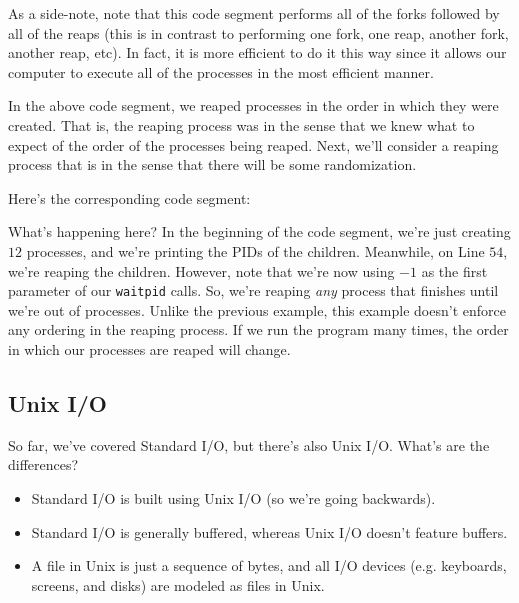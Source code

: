As a side-note, note that this code segment performs all of the forks followed by all of the reaps (this is in contrast to performing one fork, one reap, another fork, another reap, etc). In fact, it is more efficient to do it this way since it allows our computer to execute all of the processes in the most efficient manner.

In the above code segment, we reaped processes in the order in which they were created. That is, the reaping process was  in the sense that we knew what to expect of the order of the processes being reaped. Next, we'll consider a reaping process that is  in the sense that there will be some randomization.


Here's the corresponding code segment:

\lstset{caption=Probablistic Reaping} 
\begin{center}

\end{center}

What's happening here? In the beginning of the code segment, we're just creating $12$  processes, and we're printing the PIDs of the children. Meanwhile, on Line $54$, we're reaping the children. However, note that we're now using $-1$ as the first parameter of our \verb!waitpid! calls. So, we're reaping \textit{any} process that finishes until we're out of processes. Unlike the previous example, this example doesn't enforce any ordering in the reaping process. If we run the program many times, the order in which our processes are reaped will change.

 
\subsection{Unix I/O}
 
 So far, we've covered Standard I/O, but there's also Unix I/O. What's are the differences? \begin{itemize}
     \item Standard I/O is built using Unix I/O (so we're going backwards).
     \item Standard I/O is generally buffered, whereas Unix I/O doesn't feature buffers.
     \item A file in Unix is just a sequence of bytes, and all I/O devices (e.g. keyboards, screens, and disks) are modeled as files in Unix.
 \end{itemize} 
 
